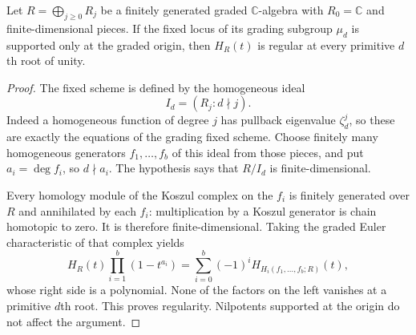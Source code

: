 \begin{lemma}
Let $R=\bigoplus_{j\ge0}R_j$ be a finitely generated graded
$\mathbb C$-algebra with $R_0=\mathbb C$ and finite-dimensional
pieces. If the fixed locus of its grading subgroup $\mu_d$ is
supported only at the graded origin, then $H_R(t)$ is regular
at every primitive $d$th root of unity.
\end{lemma}
\begin{proof}
The fixed scheme is defined by the homogeneous ideal
\[
 I_d=(R_j:d\nmid j).
\]
Indeed a homogeneous function of degree $j$ has pullback
eigenvalue $\zeta_d^j$, so these are exactly the equations
of the grading fixed scheme. Choose finitely many homogeneous
generators $f_1,\ldots,f_b$ of this ideal from those pieces,
and put $a_i=\deg f_i$, so $d\nmid a_i$.
The hypothesis says that $R/I_d$ is finite-dimensional.

Every homology module of the Koszul complex on the $f_i$ is
finitely generated over $R$ and annihilated by each $f_i$:
multiplication by a Koszul generator is chain homotopic to zero.
It is therefore finite-dimensional. Taking the graded Euler
characteristic of that complex yields
\[
 H_R(t)\prod_{i=1}^b(1-t^{a_i})
       =\sum_{i=0}^b(-1)^i H_{H_i(f_1,\ldots,f_b;R)}(t),
 \tag{PNEW-M2}
\]
whose right side is a polynomial. None of the factors on the
left vanishes at a primitive $d$th root. This proves regularity.
Nilpotents supported at the origin do not affect the argument.
\end{proof}

